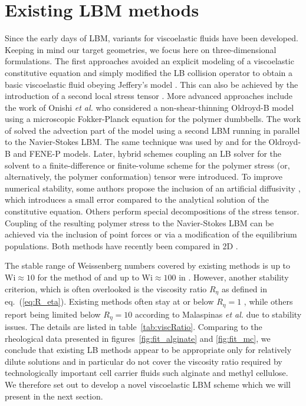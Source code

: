 \documentclass[a4paper,12pt]{scrartcl}
\begin{document}

\section{Existing LBM methods}
\label{sec:existingLBM}
Since the early days of LBM, variants for viscoelastic fluids have been developed.
Keeping in mind our target geometries, we focus here on three-dimensional formulations.
The first approaches avoided an explicit modeling of a viscoelastic constitutive equation and simply modified the LB collision operator to obtain a basic viscoelastic fluid obeying Jeffery's model \cite{lallemand2003}. This can also be achieved by the introduction of a second local stress tensor \cite{dellar2014}.
More advanced approaches include the work of Onishi \textit{et al.} \cite{onishi2005, onishi2006} who considered a non-shear-thinning Oldroyd-B model using a microscopic Fokker-Planck equation for the polymer dumbbells.
The work of \cite{wang2020} solved the advection part of the model using a second LBM running in parallel to the Navier-Stokes LBM.
The same technique was used by \cite{malaspinas2010} and \cite{ma2020} for the Oldroyd-B and FENE-P models.
Later, hybrid schemes coupling an LB solver for the solvent to a finite-difference \cite{gupta2015_2, gupta2015, gupta2016} or finite-volume \cite{kuron2021} scheme for the polymer stress (or, alternatively, the polymer conformation) tensor were introduced.
To improve numerical stability, some authors propose the inclusion of an artificial diffusivity \cite{malaspinas2010,ma2020,wang2020,wang2021}, which introduces a small error compared to the analytical solution of the constitutive equation.
Others perform special decompositions of the stress tensor\cite{dzanic2022}.
Coupling of the resulting polymer stress to the Navier-Stokes LBM can be achieved via the inclusion of point forces or via a modification of the equilibrium populations.
Both methods have recently been compared in 2D \cite{dzanic2022_2}.

The stable range of Weissenberg numbers covered by existing methods is up to $\mathrm{Wi}\approx\num{10}$ for the method of \cite{malaspinas2010} and up to $\mathrm{Wi}\approx\num{100}$ in \cite{gupta2015,ma2020,gupta2016}.
However, another stability criterion, which is often overlooked is the viscosity ratio $R_\eta$ as defined in eq.~(\ref{eq:R_eta}).
Existing methods often stay at or below $R_\eta = \num{1}$ \cite{gupta2015,onishi2006,wang2020,su2013_2,gupta2015_2}, while others report being limited below $R_\eta = \num{10}$ \cite{malaspinas2010,ma2020,kuron2021} according to Malaspinas \textit{et al.} due to stability issues.
The details are listed in table~\ref{tab:viscRatio}.
Comparing to the rheological data presented in figures~\ref{fig:fit_alginate} and \ref{fig:fit_mc}, we conclude that existing LB methods appear to be appropriate only for relatively dilute solutions and in particular do not cover the viscosity ratio required by technologically important cell carrier fluids such alginate and methyl cellulose.
We therefore set out to develop a novel viscoelastic LBM scheme which we will present in the next section.
\end{document}
